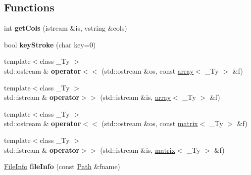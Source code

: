 \subsection*{Functions}
\begin{DoxyCompactItemize}
\item 
\mbox{\label{namespaceupc_a97b8e57e112ba7b34bf233ad20b82751}} 
int {\bfseries get\+Cols} (istream \&is, vstring \&cols)
\item 
\mbox{\label{namespaceupc_a3caf6fbcaba76b586577cab2d8b8bea0}} 
bool {\bfseries key\+Stroke} (char key=0)
\item 
\mbox{\label{namespaceupc_ab2fd910b16bf8e101ab813f01ca242e9}} 
{\footnotesize template$<$class \+\_\+\+Ty $>$ }\\std\+::ostream \& {\bfseries operator$<$$<$} (std\+::ostream \&os, const \hyperlink{classupc_1_1array}{array}$<$ \+\_\+\+Ty $>$ \&f)
\item 
\mbox{\label{namespaceupc_ac501f17fd16a4120101674beee8802b5}} 
{\footnotesize template$<$class \+\_\+\+Ty $>$ }\\std\+::istream \& {\bfseries operator$>$$>$} (std\+::istream \&is, \hyperlink{classupc_1_1array}{array}$<$ \+\_\+\+Ty $>$ \&f)
\item 
\mbox{\label{namespaceupc_ac42418ad9ea80d45b868329d67c315c5}} 
{\footnotesize template$<$class \+\_\+\+Ty $>$ }\\std\+::ostream \& {\bfseries operator$<$$<$} (std\+::ostream \&os, const \hyperlink{classupc_1_1matrix}{matrix}$<$ \+\_\+\+Ty $>$ \&f)
\item 
\mbox{\label{namespaceupc_a9d33040c9285f9e546a2cdccb017e246}} 
{\footnotesize template$<$class \+\_\+\+Ty $>$ }\\std\+::istream \& {\bfseries operator$>$$>$} (std\+::istream \&is, \hyperlink{classupc_1_1matrix}{matrix}$<$ \+\_\+\+Ty $>$ \&f)
\item 
\mbox{\label{namespaceupc_a4c5e814ef76fc815a67f0de482283ff5}} 
\hyperlink{classupc_1_1FileInfo}{File\+Info} {\bfseries file\+Info} (const \hyperlink{classupc_1_1Path}{Path} \&fname)
\end{DoxyCompactItemize}
